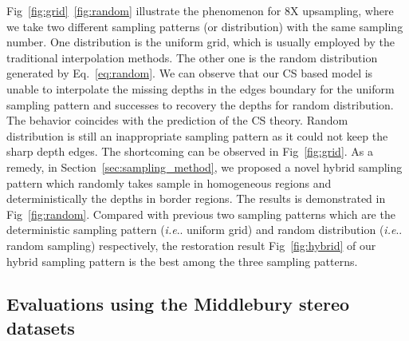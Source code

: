 \documentclass[preprint,10pt,5p,times,twocolumn]{elsarticle}
\makeatletter
\DeclareRobustCommand\onedot{\futurelet\@let@token\@onedot}
\def\@onedot{\ifx\@let@token.\else.\null\fi\xspace}
\def\ie{\emph{i.e}\onedot} \def\Ie{\emph{I.e}\onedot}
\makeatother
\begin{document}
Fig~\ref{fig:grid}~\ref{fig:random} illustrate the phenomenon for 8X upsampling, where we take two different sampling patterns (or distribution) with the same sampling number. One distribution is the uniform grid, which is usually employed by the traditional interpolation methods. The other one is the random distribution generated by Eq.~\eqref{eq:random}. We can observe that our CS based model is unable to interpolate the missing depths in the edges boundary for the uniform sampling pattern and successes to recovery the depths for random distribution. The behavior coincides with the prediction of the CS theory. Random distribution is still an inappropriate sampling pattern as it could not keep the sharp depth edges. The shortcoming can be observed in Fig~\ref{fig:grid}. As a remedy, in Section~\ref{sec:sampling_method}, we proposed a novel hybrid sampling pattern which randomly takes sample in homogeneous regions and deterministically the depths in border regions. The results is demonstrated in Fig~\ref{fig:random}. Compared with previous two sampling patterns which are the deterministic sampling pattern (\ie uniform grid) and random distribution (\ie random sampling) respectively, the restoration result Fig~\ref{fig:hybrid} of our hybrid sampling pattern is the best among the three sampling patterns.



\subsection{Evaluations using the Middlebury stereo datasets}
\label{chap:Middlebury}
\end{document}
